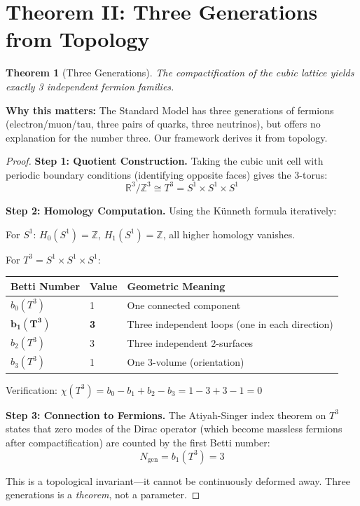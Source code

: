 \documentclass[11pt,a4paper]{article}
\theoremstyle{plain}
\newtheorem{theorem}{Theorem}[section]
\theoremstyle{definition}
\theoremstyle{remark}
\newcommand{\Ngen}{N_{\text{gen}}}
\begin{document}
\section{Theorem II: Three Generations from Topology}

\begin{theorem}[Three Generations]
The compactification of the cubic lattice yields exactly 3 independent fermion families.
\end{theorem}

\textbf{Why this matters:} The Standard Model has three generations of fermions (electron/muon/tau, three pairs of quarks, three neutrinos), but offers no explanation for the number three. Our framework derives it from topology.

\begin{proof}
\textbf{Step 1: Quotient Construction.} Taking the cubic unit cell with periodic boundary conditions (identifying opposite faces) gives the 3-torus:
\[
\mathbb{R}^3/\mathbb{Z}^3 \cong T^3 = S^1 \times S^1 \times S^1
\]

\textbf{Step 2: Homology Computation.} Using the K\"unneth formula iteratively:

For $S^1$: $H_0(S^1) = \mathbb{Z}$, $H_1(S^1) = \mathbb{Z}$, all higher homology vanishes.

For $T^3 = S^1 \times S^1 \times S^1$:

\begin{center}
\begin{tabular}{lll}
\toprule
\textbf{Betti Number} & \textbf{Value} & \textbf{Geometric Meaning} \\
\midrule
$b_0(T^3)$ & 1 & One connected component \\
$\mathbf{b_1(T^3)}$ & \textbf{3} & Three independent loops (one in each direction) \\
$b_2(T^3)$ & 3 & Three independent 2-surfaces \\
$b_3(T^3)$ & 1 & One 3-volume (orientation) \\
\bottomrule
\end{tabular}
\end{center}

Verification: $\chi(T^3) = b_0 - b_1 + b_2 - b_3 = 1 - 3 + 3 - 1 = 0$ \checkmark

\textbf{Step 3: Connection to Fermions.} The Atiyah-Singer index theorem on $T^3$ states that zero modes of the Dirac operator (which become massless fermions after compactification) are counted by the first Betti number:
\[
\Ngen = b_1(T^3) = 3
\]

This is a topological invariant---it cannot be continuously deformed away. Three generations is a \emph{theorem}, not a parameter.
\end{proof}
\end{document}
